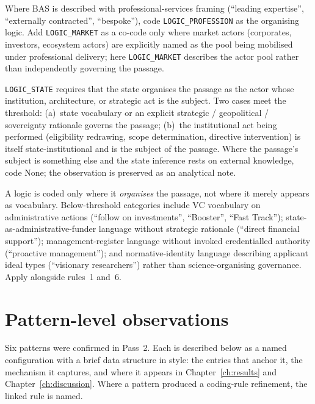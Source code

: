 \begin{description}[leftmargin=*, style=nextline]
    Where BAS is described with professional-services framing
    (\enquote{leading expertise}, \enquote{externally contracted},
    \enquote{bespoke}), code \texttt{LOGIC\_PROFESSION} as the
    organising logic. Add \texttt{LOGIC\_MARKET} as a co-code only
    where market actors (corporates, investors, ecosystem actors) are
    explicitly named as the pool being mobilised under professional
    delivery; here \texttt{LOGIC\_MARKET} describes the actor pool
    rather than independently governing the passage.
  \item[Rule~6 --- Structural state inference.]
    \texttt{LOGIC\_STATE} requires that the state organises the
    passage as the actor whose institution, architecture, or
    strategic act is the subject. Two cases meet the threshold:
    (a)~state vocabulary or an explicit strategic / geopolitical /
    sovereignty rationale governs the passage; (b)~the institutional
    act being performed (eligibility redrawing, scope determination,
    directive intervention) is itself state-institutional and is the
    subject of the passage. Where the passage's subject is something
    else and the state inference rests on external knowledge, code
    None; the observation is preserved as an analytical note.
  \item[Rule~7 --- Vocabulary versus organising logic.]
    A logic is coded only where it \emph{organises} the passage,
    not where it merely appears as vocabulary. Below-threshold
    categories include VC vocabulary on administrative actions
    (\enquote{follow on investments}, \enquote{Booster},
    \enquote{Fast Track}); state-as-administrative-funder language
    without strategic rationale (\enquote{direct financial support});
    management-register language without invoked credentialled
    authority (\enquote{proactive management}); and
    normative-identity language describing applicant ideal types
    (\enquote{visionary researchers}) rather than science-organising
    governance. Apply alongside rules~1 and~6.
\end{description}

\section{Pattern-level observations}
\label{sec:app-c-patterns}

Six patterns were confirmed in Pass~2. Each is described below as a
named configuration with a brief data structure in
\textcite{gioia2013seeking} style: the entries that anchor it, the
mechanism it captures, and where it appears in
Chapter~\ref{ch:results} and Chapter~\ref{ch:discussion}. Where a
pattern produced a coding-rule refinement, the linked rule is named.

